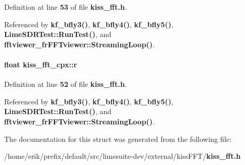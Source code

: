 Definition at line {\bf 53} of file {\bf kiss\+\_\+fft.\+h}.



Referenced by {\bf kf\+\_\+bfly3()}, {\bf kf\+\_\+bfly4()}, {\bf kf\+\_\+bfly5()}, {\bf Lime\+S\+D\+R\+Test\+::\+Run\+Test()}, and {\bf fftviewer\+\_\+fr\+F\+F\+Tviewer\+::\+Streaming\+Loop()}.

\paragraph[{r}]{\setlength{\rightskip}{0pt plus 5cm}float kiss\+\_\+fft\+\_\+cpx\+::r}\label{structkiss__fft__cpx_a5d203cc43600e5c53a7df3e91e40efba}


Definition at line {\bf 52} of file {\bf kiss\+\_\+fft.\+h}.



Referenced by {\bf kf\+\_\+bfly3()}, {\bf kf\+\_\+bfly4()}, {\bf kf\+\_\+bfly5()}, {\bf Lime\+S\+D\+R\+Test\+::\+Run\+Test()}, and {\bf fftviewer\+\_\+fr\+F\+F\+Tviewer\+::\+Streaming\+Loop()}.



The documentation for this struct was generated from the following file\+:\begin{DoxyCompactItemize}
\item 
/home/erik/prefix/default/src/limesuite-\/dev/external/kiss\+F\+F\+T/{\bf kiss\+\_\+fft.\+h}\end{DoxyCompactItemize}
